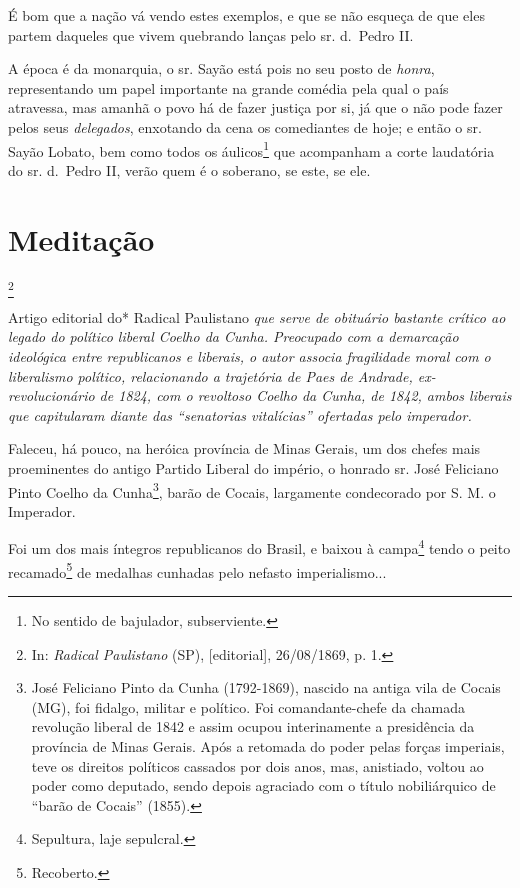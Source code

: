 É bom que a nação vá vendo estes exemplos, e que se não esqueça de que
eles partem daqueles que vivem quebrando lanças pelo sr. d.~Pedro II.

A época é da monarquia, o sr. Sayão está pois no seu posto de
\emph{honra}, representando um papel importante na grande comédia pela
qual o país atravessa, mas amanhã o povo há de fazer justiça por si, já
que o não pode fazer pelos seus \emph{delegados}, enxotando da cena os
comediantes de hoje; e então o sr. Sayão Lobato, bem como todos os
áulicos\footnote{No sentido de bajulador, subserviente.} que
acompanham a corte laudatória do sr. d.~Pedro II, verão quem é o
soberano, se este, se ele.

\chapter{Meditação}\footnote{In: \emph{Radical Paulistano} (SP),
  {[}editorial{]}, 26/08/1869, p. 1.}

\begin{didascalia}
Artigo editorial do* Radical Paulistano \emph{que serve de obituário
bastante crítico ao legado do político liberal Coelho da Cunha.
Preocupado com a demarcação ideológica entre republicanos e liberais, o
autor associa fragilidade moral com o liberalismo político, relacionando
a trajetória de Paes de Andrade, ex-revolucionário de 1824, com o
revoltoso Coelho da Cunha, de 1842, ambos liberais que capitularam
diante das ``senatorias vitalícias'' ofertadas pelo imperador.}
\end{didascalia}

\asterisc{}

Faleceu, há pouco, na heróica província de Minas Gerais, um dos chefes
mais proeminentes do antigo Partido Liberal do império, o honrado sr.
José Feliciano Pinto Coelho da Cunha\footnote{José Feliciano Pinto da
  Cunha (1792-1869), nascido na antiga vila de Cocais (MG), foi fidalgo,
  militar e político. Foi comandante-chefe da chamada revolução liberal
  de 1842 e assim ocupou interinamente a presidência da província de
  Minas Gerais. Após a retomada do poder pelas forças imperiais, teve os
  direitos políticos cassados por dois anos, mas, anistiado, voltou ao
  poder como deputado, sendo depois agraciado com o título nobiliárquico
  de ``barão de Cocais'' (1855).}, barão de Cocais, largamente condecorado
por S. M. o Imperador.

Foi um dos mais íntegros republicanos do Brasil, e baixou à
campa\footnote{Sepultura, laje sepulcral.} tendo o peito
recamado\footnote{Recoberto.} de medalhas cunhadas pelo nefasto
imperialismo...

